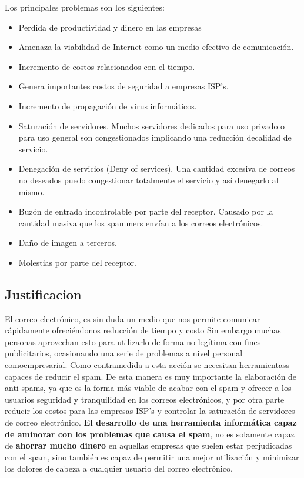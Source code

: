 \documentclass[12pt]{article}
\begin{document}
Los principales problemas son los siguientes:
\begin{itemize}
\item Perdida de productividad y dinero en las empresas
\item Amenaza la viabilidad de Internet como un medio efectivo de comunicación.
\item Incremento de costos relacionados con el tiempo.
\item Genera importantes costos de seguridad a empresas ISP’s.
\item Incremento de propagación de virus informáticos.
\item Saturación de servidores. Muchos servidores
dedicados para uso privado o para uso general son
congestionados implicando una reducción decalidad
de servicio.
\item Denegación de servicios (Deny of services). Una
cantidad excesiva de correos no deseados puedo
congestionar totalmente el servicio y así denegarlo al
mismo.
\item Buzón de entrada incontrolable por parte del
receptor. Causado por la cantidad masiva que los
spammers envían a los correos electrónicos.
\item Daño de imagen a terceros.
\item Molestias por parte del receptor.
\end{itemize}

\subsection{Justificacion}
El correo electrónico, es sin duda un medio
que nos permite comunicar rápidamente ofreciéndonos reducción de tiempo y costo Sin
embargo muchas personas aprovechan esto para
utilizarlo de forma no legítima con fines publicitarios,
ocasionando una serie de problemas a
nivel personal comoempresarial.
Como contramedida a esta acción se
necesitan herramientass capaces de reducir el spam.
De esta manera es muy importante la
elaboración de anti-spams, ya que es la forma más
viable de acabar con el spam y ofrecer a los
usuarios seguridad y tranquilidad en los correos
electrónicos, y por otra parte reducir los costos para
las empresas ISP’s y controlar la saturación
de servidores de correo electrónico.
\textbf{El desarrollo de una
herramienta informática capaz de aminorar con los
problemas que causa el spam}, no es solamente capaz
de \textbf{ahorrar mucho dinero} en aquellas empresas que
suelen estar perjudicadas con el spam, sino también es
capaz de permitir una mejor utilización y minimizar
los dolores de cabeza a cualquier usuario del correo
electrónico.\cite{emailspam}
\end{document}
